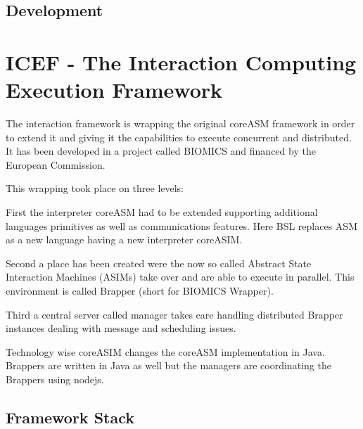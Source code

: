 
\subsection{Development}


\section{ICEF - The Interaction Computing Execution Framework}
\label{sec:icef-intro}

The interaction framework is wrapping the original coreASM framework in order to extend it and giving it the capabilities to execute concurrent and distributed. It has been developed in a project called BIOMICS and financed by the European Commission.

This wrapping took place on three levels:

First the interpreter coreASM had to be extended supporting additional languages primitives as well as communications features. Here BSL replaces ASM as a new language having a new interpreter coreASIM.

Second a place has been created were the now so called Abstract State Interaction Machines (ASIMs) take over and are able to execute in parallel. This environment is called Brapper (short for BIOMICS Wrapper).

Third a central server called manager takes care handling distributed Brapper instances dealing with message and scheduling issues.

Technology wise coreASIM changes the coreASM implementation in Java. Brappers are written in Java as well but the managers are coordinating the Brappers using nodejs.

\subsection{Framework Stack}

